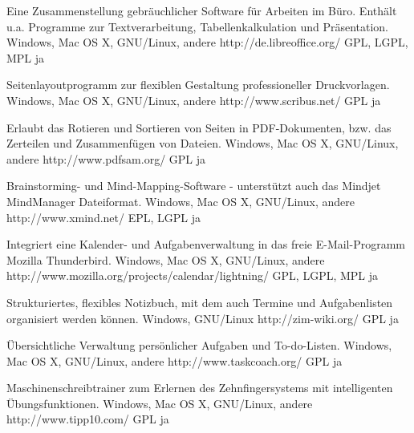 \documentclass[11pt,a4paper,landscape,twocolumn]{article}
\begin{document}


{Eine Zusammenstellung gebräuchlicher Software für Arbeiten im Büro. Enthält u.a. Programme zur Textverarbeitung, Tabellenkalkulation und Präsentation.}
{Windows, Mac OS X, GNU/Linux, andere}
{http://de.libreoffice.org/}
{GPL, LGPL, MPL}
{ja}

{Seitenlayoutprogramm zur flexiblen Gestaltung professioneller Druckvorlagen.}
{Windows, Mac OS X, GNU/Linux, andere}
{http://www.scribus.net/}
{GPL}
{ja}

{Erlaubt das Rotieren und Sortieren von Seiten in PDF-Dokumenten, bzw. das Zerteilen und Zusammenfügen von Dateien.}
{Windows, Mac OS X, GNU/Linux, andere}
{http://www.pdfsam.org/}
{GPL}
{ja}

{Brainstorming- und Mind-Mapping-Software - unterstützt auch das Mindjet MindManager Dateiformat.}
{Windows, Mac OS X, GNU/Linux, andere}
{http://www.xmind.net/}
{EPL, LGPL}
{ja}


\newpage %


{Integriert eine Kalender- und Aufgabenverwaltung in das freie E-Mail-Programm Mozilla Thunderbird.}
{Windows, Mac OS X, GNU/Linux, andere}
{http://www.mozilla.org/projects/calendar/lightning/}
{GPL, LGPL, MPL}
{ja}

{Strukturiertes, flexibles Notizbuch, mit dem auch Termine und Aufgabenlisten organisiert werden können.}
{Windows, GNU/Linux}
{http://zim-wiki.org/}
{GPL}
{ja}

{Übersichtliche Verwaltung persönlicher Aufgaben und To-do-Listen.}
{Windows, Mac OS X, GNU/Linux, andere}
{http://www.taskcoach.org/}
{GPL}
{ja}

{Maschinenschreibtrainer zum Erlernen des Zehnfingersystems mit intelligenten Übungsfunktionen.}
{Windows, Mac OS X, GNU/Linux, andere}
{http://www.tipp10.com/}
{GPL}
{ja}
\end{document}
